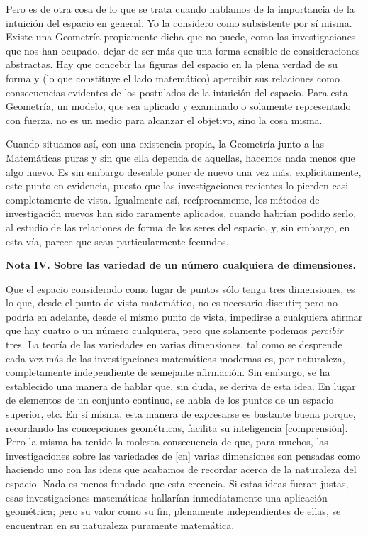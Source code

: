 \documentclass[a4paper, 12pt]{article}
\begin{document}
 Pero es de otra cosa de lo que se trata cuando hablamos de la importancia de la intuición del espacio en general. Yo la considero como subsistente por sí misma. Existe una Geometría propiamente dicha que no puede, como las investigaciones que nos han ocupado, dejar de ser más que una forma sensible de consideraciones abstractas. Hay que concebir las figuras del espacio en la plena verdad de su forma y (lo que constituye el lado matemático) apercibir sus relaciones como consecuencias evidentes de los postulados de la intuición del espacio. Para esta Geometría, un modelo, que sea aplicado y examinado o solamente representado con fuerza, no es un medio para alcanzar el objetivo, sino la cosa misma.

 Cuando situamos así, con una existencia propia, la Geometría junto a las Matemáticas puras y sin que ella dependa de aquellas, hacemos nada menos que algo nuevo. Es sin embargo deseable poner de nuevo una vez más, explícitamente, este punto en evidencia, puesto que las investigaciones recientes lo pierden casi completamente de vista. Igualmente así, recíprocamente, los métodos de investigación nuevos han sido raramente aplicados, cuando habrían podido serlo, al estudio de las relaciones de forma de los seres del espacio, y, sin embargo, en esta vía, parece que sean particularmente fecundos. 



 \noindent \textbf{Nota IV. Sobre las variedad de un número cualquiera de dimensiones.}

 Que el espacio considerado como lugar de puntos sólo tenga tres dimensiones, es lo que, desde el punto de vista matemático, no es necesario discutir; pero no podría en adelante, desde el mismo punto de vista, impedirse a cualquiera afirmar que hay cuatro o un número cualquiera, pero que solamente podemos \textit{percibir} tres. La teoría de las variedades en varias dimensiones, tal como se desprende cada vez más de las investigaciones matemáticas modernas es, por naturaleza, completamente independiente de semejante afirmación. Sin embargo, se ha establecido una manera de hablar que, sin duda, se deriva de esta idea. En lugar de elementos de un conjunto continuo, se habla de los puntos de un espacio superior, etc. En sí misma, esta manera de expresarse es bastante buena porque, recordando las concepciones geométricas, facilita su inteligencia [comprensión]. Pero la misma ha tenido la molesta consecuencia de que, para muchos, las investigaciones sobre las variedades de [en] varias dimensiones son pensadas como haciendo uno con las ideas que acabamos de recordar acerca de la naturaleza del espacio. Nada es menos fundado que esta creencia. Si estas ideas fueran justas, esas investigaciones matemáticas hallarían inmediatamente una aplicación geométrica; pero su valor como su fin, plenamente independientes de ellas, se encuentran en su naturaleza puramente matemática.
\end{document}

